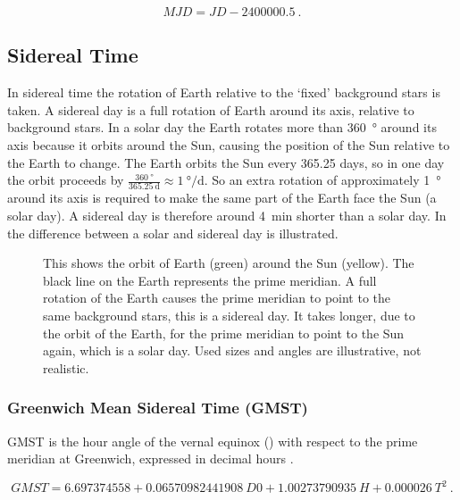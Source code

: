 \begin{equation}
    \mathit{MJD} = \mathit{JD} - 2400000.5 \ .
\end{equation}


\subsection{Sidereal Time}

In sidereal time the rotation of Earth relative to the `fixed'
background stars is taken. A sidereal day is a full rotation of Earth
around its axis, relative to background stars. In a solar day the Earth
rotates more than \SI{360}{\degree} around its axis because it orbits
around the Sun, causing the position of the Sun relative to the Earth to
change. The Earth orbits the Sun every 365.25 days, so in one day the
orbit proceeds by $\frac{\SI{360}{\degree}}{\SI{365.25}{\day}} \approx
\SI{1}{\degree\per\day}$. So an extra rotation of approximately
\SI{1}{\degree} around its axis is required to make the same part of the
Earth face the Sun (a solar day). A sidereal day is therefore around
\SI{4}{\minute} shorter than a solar day. In 
the difference between a solar and sidereal day is illustrated.

\begin{figure}
    \centering
    
    \caption{This shows the orbit of Earth (green) around the Sun
             (yellow). The black line on the Earth represents the prime
             meridian. A full rotation of the Earth causes the prime
             meridian to point to the same background stars, this is a
             sidereal day. It takes longer, due to the orbit of the
             Earth, for the prime meridian to point to the Sun again,
             which is a solar day. Used sizes and angles are
             illustrative, not realistic.}
    \label{fig:sidereal_time}
\end{figure}


\subsubsection{Greenwich Mean Sidereal Time (GMST)}

GMST is the hour angle of the vernal equinox ()
with respect to the prime meridian at Greenwich, expressed in decimal
hours \cite{kaplan:2011aa}.

\begin{equation}
    \mathit{GMST} = 6.697374558 + 0.06570982441908\ \mathit{D0} +
                    1.00273790935\ H + 0.000026\ T^2 \ .
\end{equation}

